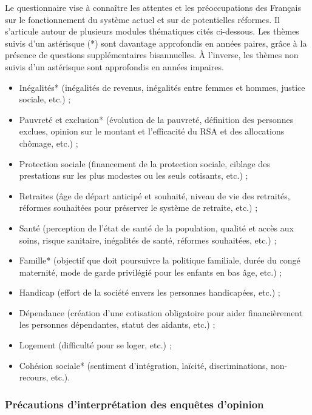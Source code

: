 \documentclass[12pt,a4paper]{reedthesis}
\providecommand{\tightlist}{%
  \setlength{\itemsep}{0pt}\setlength{\parskip}{0pt}}
\begin{document}
Le questionnaire vise à connaître les attentes et les préoccupations des Français sur le fonctionnement du système actuel et sur de potentielles réformes. Il s'articule autour de plusieurs modules thématiques cités ci-dessous. Les thèmes suivis d'un astérisque (*) sont davantage approfondis en années paires, grâce à la présence de questions supplémentaires bisannuelles. À l'inverse, les thèmes non suivis d'un astérisque sont approfondis en années impaires.
\begin{itemize}
\tightlist
\item
  Inégalités* (inégalités de revenus, inégalités entre femmes et hommes, justice sociale, etc.) ;
\item
  Pauvreté et exclusion* (évolution de la pauvreté, définition des personnes exclues, opinion sur le montant et l'efficacité du RSA et des allocations chômage, etc.) ;
\item
  Protection sociale (financement de la protection sociale, ciblage des prestations sur les plus modestes ou les seuls cotisants, etc.) ;
\item
  Retraites (âge de départ anticipé et souhaité, niveau de vie des retraités, réformes souhaitées pour préserver le système de retraite, etc.) ;
\item
  Santé (perception de l'état de santé de la population, qualité et accès aux soins, risque sanitaire, inégalités de santé, réformes souhaitées, etc.) ;
\item
  Famille* (objectif que doit poursuivre la politique familiale, durée du congé maternité, mode de garde privilégié pour les enfants en bas âge, etc.) ;
\item
  Handicap (effort de la société envers les personnes handicapées, etc.) ;
\item
  Dépendance (création d'une cotisation obligatoire pour aider financièrement les personnes dépendantes, statut des aidants, etc.) ;
\item
  Logement (difficulté pour se loger, etc.) ;
\item
  Cohésion sociale* (sentiment d'intégration, laïcité, discriminations, non-recours, etc.).
\end{itemize}
\hypertarget{pruxe9cautions-dinterpruxe9tation-des-enquuxeates-dopinion}{%
\subsubsection{Précautions d'interprétation des enquêtes d'opinion}\label{pruxe9cautions-dinterpruxe9tation-des-enquuxeates-dopinion}}
\end{document}
